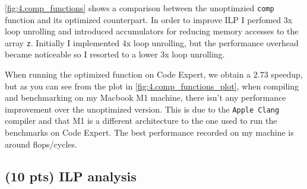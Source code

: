 \documentclass[tikz,14pt,fleqn]{article}
\begin{document}
\subsubsection{} %

\subsubsection{} %
\autoref{fig:4.comp_functions} shows a comparison between the unoptimzied \texttt{comp} function and its optimized counterpart. In order to improve ILP I perfomed 3x loop unrolling and introduced accumulators for reducing memory accesses to the array \texttt{z}. Initially I implemented 4x loop unrolling, but the performance overhead became noticeable so I resorted to a lower 3x loop unrolling.

When running the optimized function on Code Expert, we obtain a $2.73$ speedup, but as you can see from the plot in \autoref{fig:4.comp_functions_plot}, when compiling and benchmarking on my Macbook M1 machine, there isn't any performance improvement over the unoptimized version. This is due to the \texttt{Apple Clang} compiler and that M1 is a different architecture to the one used to run the benchmarks on Code Expert. The best performance recorded on my machine is around  flops/cycles.



\subsection{(10 pts) ILP analysis}
\subsubsection{} %
\begin{figure}
    \centering
    \vspace*{-0.7cm}
    \begin{subfigure}{\linewidth}
        \inputminted[fontsize=\scriptsize, linenos, bgcolor=CODEBG]{C}{../ex5/artcomp.c}
    \end{subfigure}
\end{figure}

\subsubsection{} %
\end{document}
